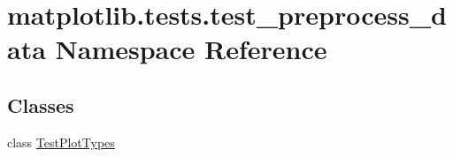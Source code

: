 \hypertarget{namespacematplotlib_1_1tests_1_1test__preprocess__data}{}\section{matplotlib.\+tests.\+test\+\_\+preprocess\+\_\+data Namespace Reference}
\label{namespacematplotlib_1_1tests_1_1test__preprocess__data}
\subsection*{Classes}
\begin{DoxyCompactItemize}
\item 
class \hyperlink{classmatplotlib_1_1tests_1_1test__preprocess__data_1_1TestPlotTypes}{Test\+Plot\+Types}
\end{DoxyCompactItemize}
